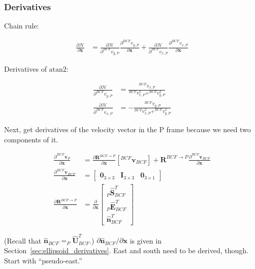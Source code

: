 \documentclass[]{article}
\newcommand{\vb}[1]{\bm{#1}} %
\newcommand{\vbh}[1]{\hat{\bm{#1}}} %
\newcommand{\pd}[2]{\frac{\partial #1}{\partial #2}} %
\begin{document}
\subsubsection{Derivatives}
\label{sec:heading_polar_bcf_derivatives}

Chain rule:

\begin{align}
\pd{\mathcal{H}}{\vb{x}} &= \pd{\mathcal{H}}{^{BCF} v_{y, P}} \pd{^{BCF} v_{y, P}}{\vb{x}} + \pd{\mathcal{H}}{^{BCF} v_{x, P}} \pd{^{BCF} v_{x, P}}{\vb{x}}  
\end{align}

Derivatives of $\mathrm{atan2}$:

\begin{align}
\pd{\mathcal{H}}{^{BCF} {v}_{y, P}} &= \frac{^{BCF} v_{x, P}}{^{BCF} v_{x, P}^2 + ^{BCF} v_{y, P}^2} \\
\pd{\mathcal{H}}{^{BCF} {v}_{x, P}} &= - \frac{^{BCF} v_{y, P}}{^{BCF} v_{x, P}^2 + ^{BCF} v_{y, P}^2}
\end{align}

Next, get derivatives of the velocity vector in the P frame because we need two components of it.

\begin{align}
\label{eq:v_polar_wrt_bcf_derivative}
\pd{^{BCF} \vb{v}_P}{\vb{x}} &= \pd{\vb{R}^{BCF \rightarrow P}}{\vb{x}} \left[ ^{BCF} \vb{v}_{BCF} \right] + \vb{R}^{BCF \rightarrow P} \pd{^{BCF} \vb{v}_{BCF}}{\vb{x}} \\
\pd{^{BCF} \vb{v}_{BCF}}{\vb{x}} &= \left[ \begin{array}{ccc}
\vb{0}_{3 \times 3} & \vb{I}_{3 \times 3} & \vb{0}_{3 \times 1} \end{array} \right] \\
\label{eq:R_bcf2p_derivative}
\pd{\vb{R}^{BCF \rightarrow P}}{\vb{x}} &= \pd{}{\vb{x}} \left[ \begin{array}{c}
_P \vbh{S}_{BCF}^T \\
_P \vbh{E}_{BCF}^T \\
\vbh{n}_{BCF}^T
\end{array} \right]
\end{align}

\noindent (Recall that $\vbh{n}_{BCF} = _P \vbh{U}_{BCF}^T$.) $\partial \vbh{n}_{BCF} / \partial \vb{x}$ is given in Section~\ref{sec:ellipsoid_derivatives}. East and south need to be derived, though. Start with ``pseudo-east.''
\end{document}
